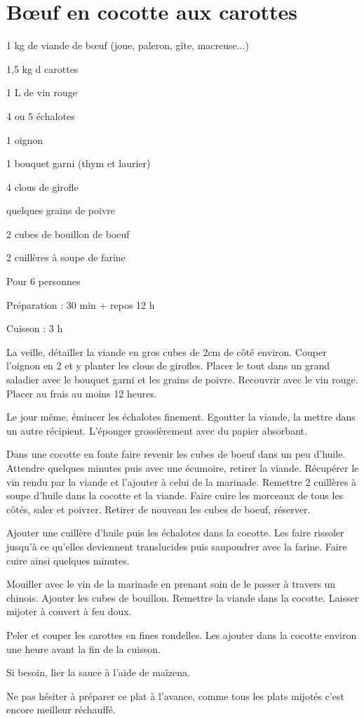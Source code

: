 \section{Bœuf en cocotte aux carottes}

\begin{ingredients}
\item 1 kg de viande de bœuf (joue, paleron, gîte, macreuse...)
\item 1,5 kg d carottes
\item 1 L de vin rouge
\item 4 ou 5 échalotes
\item 1 oignon
\item 1 bouquet garni (thym et laurier)
\item 4 clous de girofle
\item quelques grains de poivre
\item 2 cubes de bouillon de boeuf
\item 2 cuillères à soupe de farine
\end{ingredients}
\begin{infos}
\item Pour 6 personnes		%
\item Préparation : 30 min + repos 12 h		%
\item Cuisson : 3 h			%
\end{infos}
\begin{etapes}
\item La veille, détailler la viande en gros cubes de 2cm de côté environ. Couper l'oignon en 2 et y planter les clous de girofles. Placer le tout dans un grand saladier avec le bouquet garni et les grains de poivre. Recouvrir avec le vin rouge. Placer au frais au moins 12 heures.
\item Le jour même, émincer les échalotes finement. Egoutter la viande, la mettre dans un autre récipient. L'éponger grossièrement avec du papier absorbant. 
\item Dans une cocotte en fonte faire revenir les cubes de boeuf dans un peu d'huile. Attendre quelques minutes puis avec une écumoire, retirer la viande. Récupérer le vin rendu par la viande et l'ajouter à celui de la marinade. Remettre 2 cuillères à soupe d'huile dans la cocotte et la viande. Faire cuire les morceaux de tous les côtés, saler et poivrer. Retirer de nouveau les cubes de boeuf, réserver. 
\item Ajouter une cuillère d'huile puis les échalotes dans la cocotte. Les faire rissoler jusqu'à ce qu'elles deviennent translucides puis saupoudrer avec la farine. Faire cuire ainsi quelques minutes. 
\item Mouiller avec le vin de la marinade en prenant soin de le passer à travers un chinois. Ajouter les cubes de bouillon. Remettre la viande dans la cocotte. Laisser mijoter à couvert à feu doux.
\item Peler et couper les carottes en fines rondelles. Les ajouter dans la cocotte environ une heure avant la fin de la cuisson.
\item Si besoin, lier la sauce à l'aide de maïzena.
\end{etapes}
\begin{conseils}
Ne pas hésiter à préparer ce plat à l'avance, comme tous les plats mijotés c'est encore meilleur réchauffé.
\end{conseils}
